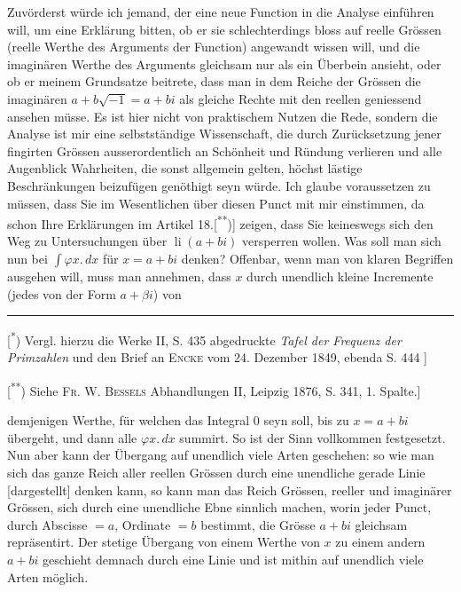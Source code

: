 \indent Zuvörderst würde ich jemand, der eine neue Function in die Analyse einführen will, um eine Erklärung bitten, ob er sie schlechterdings bloss auf reelle Grössen (reelle Werthe des Arguments der Function) angewandt wissen will, und die imaginären Werthe des Arguments gleichsam nur als ein Überbein ansieht, oder ob er meinem Grundsatze beitrete, dass man in dem Reiche der Grössen die imaginären $a+b\surd{-1}=a+bi$ als gleiche Rechte mit den reellen geniessend ansehen müsse. Es ist hier nicht von praktischem Nutzen die Rede, sondern die Analyse ist mir eine selbstständige Wissenschaft, die durch Zurücksetzung jener fingirten Grössen ausserordentlich an Schönheit und Ründung verlieren und alle Augenblick Wahrheiten, die sonst allgemein gelten, höchst lästige Beschränkungen beizufügen genöthigt seyn würde. Ich glaube voraussetzen zu müssen, dass Sie im Wesentlichen über diesen Punct mit mir einstimmen, da schon Ihre Erklärungen im Artikel 18.[\textsuperscript{**})] zeigen, dass Sie keineswegs sich den Weg zu Untersuchungen über $\operatorname{li}(a+bi)$ versperren wollen. Was soll man sich nun bei $\int\varphi x{.}\,dx$ für $x=a+bi$ denken? Offenbar, wenn man von klaren Begriffen ausgehen will, muss man annehmen, dass $x$ durch unendlich kleine Incremente (jedes von der Form $a+\beta i$) von
\par\medskip\noindent\rule{.24\linewidth}{.4pt}\par\smallskip
{\small
\noindent\hspace*{\parindent}[\textsuperscript{*}) Vergl. hierzu die Werke II, S. 435 abgedruckte \textit{Tafel der Frequenz der Primzahlen} und den Brief an \textsc{Encke} vom 24. Dezember 1849, ebenda S. 444 ]
\par\noindent\hspace*{\parindent}[\textsuperscript{**}) Siehe \textsc{Fr. W. Bessels} Abhandlungen II, Leipzig 1876, S. 341, 1. Spalte.]
\par}
\clearpage{}
\noindent demjenigen Werthe, für welchen das Integral 0 seyn soll, bis zu $x=a+bi$ übergeht, und dann alle $\varphi x{.}\,dx$ summirt. So ist der Sinn vollkommen festgesetzt. Nun aber kann der Übergang auf unendlich viele Arten geschehen: so wie man sich das ganze Reich aller reellen Grössen durch eine unendliche gerade Linie [dargestellt] denken kann, so kann man das  Reich  Grössen, reeller und imaginärer Grössen, sich durch eine unendliche Ebne sinnlich machen, worin jeder Punct, durch Abscisse $=a$, Ordinate $=b$ bestimmt, die Grösse $a+bi$ gleichsam repräsentirt. Der stetige Übergang von einem Werthe von $x$ zu einem andern $a+bi$ geschieht demnach durch eine Linie und ist mithin auf unendlich viele Arten möglich.

